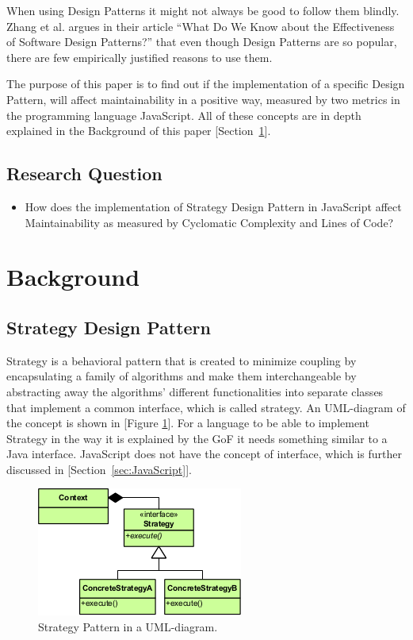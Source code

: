 \documentclass[conference, a4paper]{IEEEtran}
\begin{document}
When using Design Patterns it might not always be good to follow them blindly. Zhang et al. argues in their article ``What Do We Know about the Effectiveness of Software Design Patterns?'' that even though Design Patterns are so popular, there are few empirically justified reasons to use them.~\cite{bibitem:Zhang}

The purpose of this paper is to find out if the implementation of a specific Design Pattern, will affect maintainability in a positive way, measured by two metrics in the programming language JavaScript. All of these concepts are in depth explained in the Background of this paper [Section~\ref{sec:Background}].

\subsection{Research Question}
\begin{itemize}
	\item How does the implementation of Strategy Design Pattern in JavaScript affect Maintainability as measured by Cyclomatic Complexity and Lines of Code?
\end{itemize}

\section{Background}
\label{sec:Background}

\subsection{Strategy Design Pattern}
\label{sec:Strategy}

Strategy is a behavioral pattern that is created to minimize coupling by encapsulating a family of algorithms and make them interchangeable by abstracting away the algorithms' different functionalities into separate classes that implement a common interface, which is called strategy. An UML-diagram of the concept is shown in [Figure \ref{fig:Strategy}]. For a language to be able to implement Strategy in the way it is explained by the GoF it needs something similar to a Java interface. JavaScript does not have the concept of interface, which is further discussed in [Section~\ref{sec:JavaScript}].~\cite{bibitem:GoF}

\begin{figure}[ht!]
	\centering
	\includegraphics[scale=0.7]{Strategy_Pattern_in_UML.png}
	\caption{Strategy Pattern in a UML-diagram.}
	\label{fig:Strategy}
\end{figure}
\end{document}
